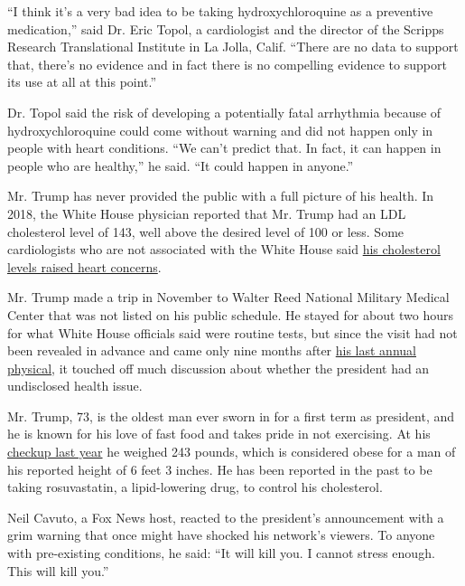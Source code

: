 ``I think it's a very bad idea to be taking hydroxychloroquine as a
preventive medication,'' said Dr. Eric Topol, a cardiologist and the
director of the Scripps Research Translational Institute in La Jolla,
Calif. ``There are no data to support that, there's no evidence and in
fact there is no compelling evidence to support its use at all at this
point.''

Dr. Topol said the risk of developing a potentially fatal arrhythmia
because of hydroxychloroquine could come without warning and did not
happen only in people with heart conditions. ``We can't predict that. In
fact, it can happen in people who are healthy,'' he said. ``It could
happen in anyone.''

Mr. Trump has never provided the public with a full picture of his
health. In 2018, the White House physician reported that Mr. Trump had
an LDL cholesterol level of 143, well above the desired level of 100 or
less. Some cardiologists who are not associated with the White House
said
\href{https://www.nytimes.com/2018/01/17/us/politics/trump-physical-heart-health-cholesterol.html}{his
cholesterol levels raised heart concerns}.

Mr. Trump made a trip in November to Walter Reed National Military
Medical Center that was not listed on his public schedule. He stayed for
about two hours for what White House officials said were routine tests,
but since the visit had not been revealed in advance and came only nine
months after
\href{https://slack-redir.net/link?url=https\%3A\%2F\%2Fwww.nytimes.com\%2F2019\%2F02\%2F14\%2Fus\%2Fpolitics\%2Ftrump-obese.html\%3Faction\%3Dclick\%26module\%3DRelatedLinks\%26pgtype\%3DArticle}{his
last annual physical}, it touched off much discussion about whether the
president had an undisclosed health issue.

Mr. Trump, 73, is the oldest man ever sworn in for a first term as
president, and he is known for his love of fast food and takes pride in
not exercising. At his
\href{https://www.nytimes.com/2019/02/14/us/politics/trump-obese.html}{checkup
last year} he weighed 243 pounds, which is considered obese for a man of
his reported height of 6 feet 3 inches. He has been reported in the past
to be taking rosuvastatin, a lipid-lowering drug, to control his
cholesterol.

Neil Cavuto, a Fox News host, reacted to the president's announcement
with a grim warning that once might have shocked his network's viewers.
To anyone with pre-existing conditions, he said: ``It will kill you. I
cannot stress enough. This will kill you.''

